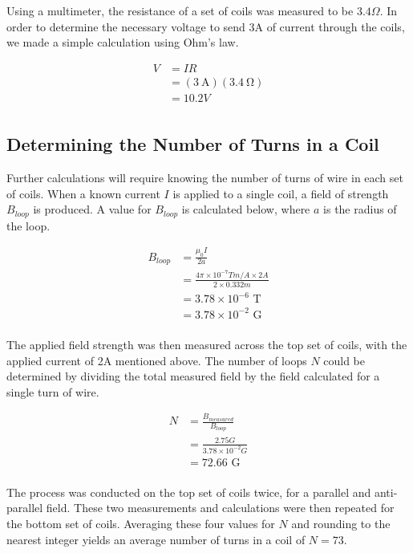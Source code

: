 \documentclass[a4paper]{article}
\begin{document}
\qq Using a multimeter, the resistance of a set of coils was measured to be
$3.4 \Omega$. In order to determine the necessary voltage to send 3A of current
through the coils, we made a simple calculation using Ohm's law.


\begin{align*}
V &= IR \\
  &= (\SI{3}{\ampere})(\SI{3.4}{\ohm}) \\
  &= 10.2V \\
\end{align*}

\subsection{Determining the Number of Turns in a Coil}

\qq Further calculations will require knowing the number of turns of wire in each set of coils. When a known current $I$ is applied to a single coil, a field of strength $B_{loop}$ is produced. A value for $B_{loop}$ is calculated below, where $a$ is the radius of the loop.

\begin{align*}
B_{loop} &= \frac{\mu_0 I}{2a} \\
         &= \frac{4 \pi \times 10^{-7} Tm/A \times 2A}{2\times 0.332m} \\
         &= 3.78 \times 10^{-6} \text{ T} \\
         &= 3.78 \times 10^{-2} \text{ G} \\
\end{align*}

The applied field strength was then measured across the top set of coils, with the applied current of 2A mentioned above. The number of loops $N$ could be determined by dividing the total measured field by the field calculated for a single turn of wire.

\begin{align*}
N &= \frac{B_{measured}}{B_{loop}} \\
  &= \frac{2.75G}{3.78 \times 10^{-2}G} \\
  &= 72.66 \text{ G} \\
\end{align*}

The process was conducted on the top set of coils twice, for a parallel and anti-parallel field. These two measurements and calculations were then repeated for the bottom set of coils. Averaging these four values for $N$ and rounding to the nearest integer yields an average number of turns in a coil of $N=73$.
\end{document}

